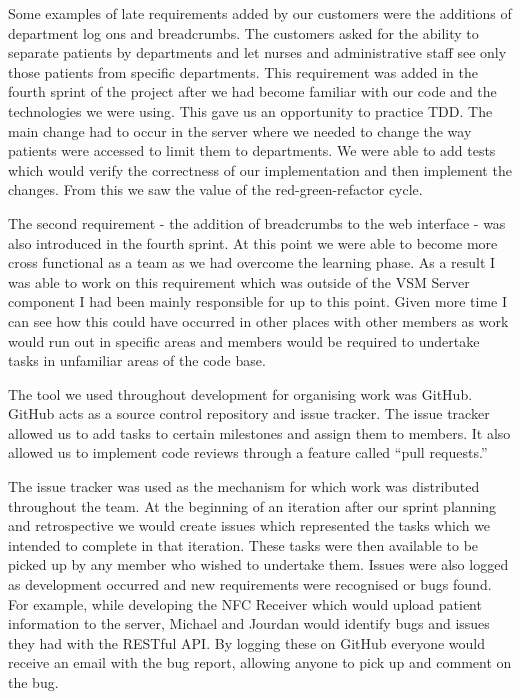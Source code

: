 \documentclass[conference]{IEEEtran}
\begin{document}
Some examples of late requirements added by our customers were the additions of
department log ons and breadcrumbs. The customers asked for the ability to
separate patients by departments and let nurses and administrative staff see
only those patients from specific departments. This requirement was added in the
fourth sprint of the project after we had become familiar with our code and the
technologies we were using. This gave us an opportunity to practice TDD. The
main change had to occur in the server where we needed to change the way
patients were accessed to limit them to departments. We were able to add tests
which would verify the correctness of our implementation and then implement the
changes. From this we saw the value of the red-green-refactor cycle.

The second requirement - the addition of breadcrumbs to the web interface - was
also introduced in the fourth sprint. At this point we were able to become more
cross functional as a team as we had overcome the learning phase. As a result I
was able to work on this requirement which was outside of the VSM Server
component I had been mainly responsible for up to this point. Given more time I
can see how this could have occurred in other places with other members as work
would run out in specific areas and members would be required to undertake tasks
in unfamiliar areas of the code base.

The tool we used throughout development for organising work was GitHub. GitHub
acts as a source control repository and issue tracker. The issue tracker allowed
us to add tasks to certain milestones and assign them to members. It also
allowed us to implement code reviews through a feature called ``pull requests.''

The issue tracker was used as the mechanism for which work was distributed
throughout the team. At the beginning of an iteration after our sprint planning
and retrospective we would create issues which represented the tasks which we
intended to complete in that iteration. These tasks were then available to be
picked up by any member who wished to undertake them. Issues were also logged as
development occurred and new requirements were recognised or bugs found. For
example, while developing the NFC Receiver which would upload patient
information to the server, Michael and Jourdan would identify bugs and issues
they had with the RESTful API. By logging these on GitHub everyone would receive
an email with the bug report, allowing anyone to pick up and comment on the bug.
\end{document}
